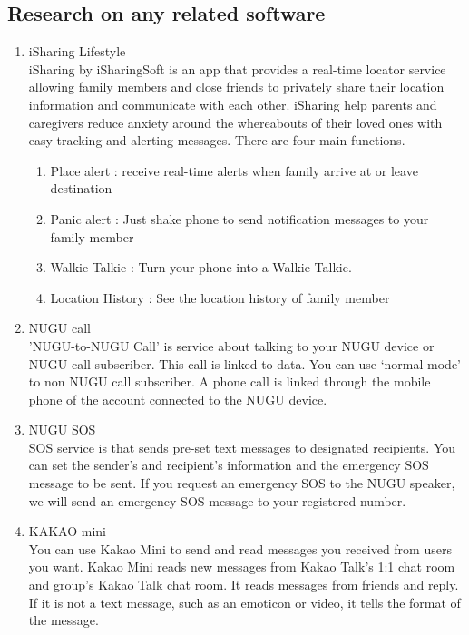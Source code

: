 \documentclass[conference]{IEEEtran}
\begin{document}
\subsection{Research on any related software}
\begin{enumerate}
    \item iSharing Lifestyle\\
iSharing by iSharingSoft is an app that provides a real-time locator service allowing family members and close friends to privately share their location information and communicate with each other. iSharing help parents and caregivers reduce anxiety around the whereabouts of their loved ones with easy tracking and alerting messages. There are four main functions.
\begin{enumerate}
    \item Place alert : receive real-time alerts when family arrive at or leave destination
    \item Panic alert : Just shake phone to send notification messages to your family member
    \item Walkie-Talkie : Turn your phone into a Walkie-Talkie.
    \item Location History : See the location history of family member\\
\end{enumerate}
\item NUGU call\\
'NUGU-to-NUGU Call' is service about talking to your NUGU device or NUGU call subscriber.
This call is linked to data. You can use ‘normal mode’ to non NUGU call subscriber. A phone call is linked through the mobile phone of the account connected to the NUGU device.\\
\item NUGU SOS\\
 SOS service is that sends pre-set text messages to designated recipients. You can set the sender's and recipient's information and the emergency SOS message to be sent. If you request an emergency SOS to the NUGU speaker, we will send an emergency SOS message to your registered number.\\
 \item KAKAO mini\\
You can use Kakao Mini to send and read messages you received from users you want. Kakao Mini reads new messages from Kakao Talk's 1:1 chat room and group's Kakao Talk chat room. It reads messages from friends and reply. If it is not a text message, such as an emoticon or video, it tells the format of the message.
\end{enumerate}
\end{document}
